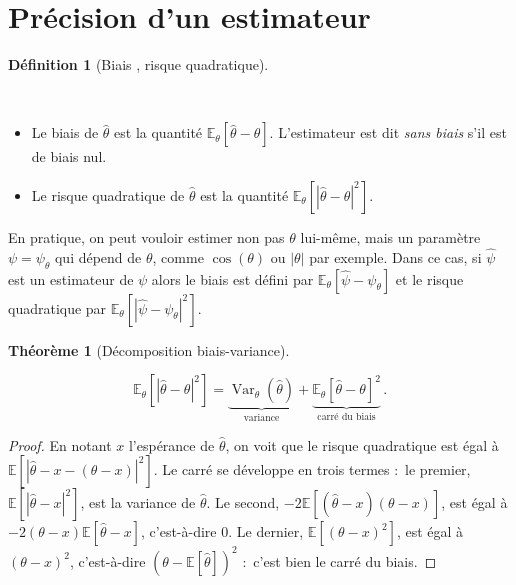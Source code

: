 \documentclass[
  10,
  letterpaper,
  DIV=11,
  numbers=noendperiod]{scrreport}
\providecommand{\tightlist}{%
  \setlength{\itemsep}{0pt}\setlength{\parskip}{0pt}}\usepackage{longtable,booktabs,array}
\theoremstyle{plain}
\newtheorem{theorem}{Théorème}[chapter]
\theoremstyle{definition}
\theoremstyle{plain}
\theoremstyle{definition}
\newtheorem{definition}{Définition}[chapter]
\theoremstyle{definition}
\theoremstyle{plain}
\theoremstyle{remark}
\begin{document}
\hypertarget{pruxe9cision-dun-estimateur}{%
\section{Précision d'un estimateur}\label{pruxe9cision-dun-estimateur}}

\begin{definition}[Biais , risque
quadratique]\protect\hypertarget{def-biais}{}\label{def-biais}

~

\begin{itemize}
\tightlist
\item
  Le biais de \(\hat{\theta}\) est la quantité
  \(\mathbb{E}_\theta[\hat\theta - \theta]\). L'estimateur est dit
  \emph{sans biais} s'il est de biais nul.
\item
  Le risque quadratique de \(\hat\theta\) est la quantité
  \(\mathbb{E}_{\theta}[ |\hat{\theta}- \theta|^2]\).
\end{itemize}

\end{definition}

En pratique, on peut vouloir estimer non pas \(\theta\) lui-même, mais
un paramètre \(\psi = \psi_\theta\) qui dépend de \(\theta\), comme
\(\cos(\theta)\) ou \(|\theta|\) par exemple. Dans ce cas, si
\(\hat{\psi}\) est un estimateur de \(\psi\) alors le biais est défini
par \(\mathbb{E}_\theta[\hat{\psi} - \psi_\theta]\) et le risque
quadratique par \(\mathbb{E}_\theta [ |\hat\psi - \psi_\theta|^2]\).

\begin{theorem}[Décomposition
biais-variance]\protect\hypertarget{thm-biaisvar}{}\label{thm-biaisvar}

\[
\mathbb{E}_{\theta} [|\hat{\theta}-\theta|^2]
= \underbrace{\operatorname{Var}_{\theta} (\hat{\theta})}_{\text{variance}} +
\underbrace{\mathbb{E}_{\theta}[\hat{\theta}-\theta]^2}_{\text{carré du biais}} \, .
\]

\end{theorem}

\begin{proof}

En notant \(x\) l'espérance de \(\hat{\theta}\), on voit que le risque
quadratique est égal à
\(\mathbb{E}[|\hat{\theta} - x - (\theta - x)|^2]\). Le carré se
développe en trois termes :~le premier,
\(\mathbb{E}[|\hat{\theta} - x|^2]\), est la variance de
\(\hat{\theta}\). Le second,
\(-2\mathbb{E}[(\hat{\theta} - x)(\theta - x)]\), est égal à
\(-2(\theta - x)\mathbb{E}[\hat{\theta} - x]\), c'est-à-dire 0. Le
dernier, \(\mathbb{E}[(\theta - x)^2]\), est égal à \((\theta - x)^2\),
c'est-à-dire \((\theta - \mathbb{E}[\hat{\theta}])^2\) :~c'est bien le
carré du biais.

\end{proof}
\end{document}
